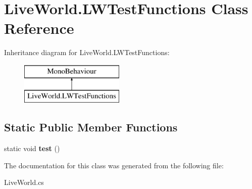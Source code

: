 \hypertarget{class_live_world_1_1_l_w_test_functions}{}\section{Live\+World.\+L\+W\+Test\+Functions Class Reference}
\label{class_live_world_1_1_l_w_test_functions}
Inheritance diagram for Live\+World.\+L\+W\+Test\+Functions\+:\begin{figure}[H]
\begin{center}
\leavevmode
\includegraphics[height=2.000000cm]{class_live_world_1_1_l_w_test_functions}
\end{center}
\end{figure}
\subsection*{Static Public Member Functions}
\begin{DoxyCompactItemize}
\item 
\hypertarget{class_live_world_1_1_l_w_test_functions_ab54a19ea3f439ff02276719c836ce9a3}{}static void {\bfseries test} ()\label{class_live_world_1_1_l_w_test_functions_ab54a19ea3f439ff02276719c836ce9a3}

\end{DoxyCompactItemize}


The documentation for this class was generated from the following file\+:\begin{DoxyCompactItemize}
\item 
Live\+World.\+cs\end{DoxyCompactItemize}
